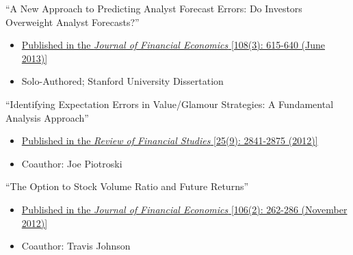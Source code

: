 \pagebreak[0]
\begin{samepage}
\item ``A New Approach to Predicting Analyst Forecast Errors: Do Investors Overweight Analyst Forecasts?''
\begin{itemize}
\vspace*{-.07in}
	\item \href{https://doi.org/10.1016/j.jfineco.2013.02.002}{Published in the {\it Journal of Financial Economics} [108(3): 615-640 (June 2013)]}
\vspace*{-.07in}
	\item  Solo-Authored; Stanford University Dissertation
\end{itemize}
\end{samepage}

\vskip 0.08cm

\pagebreak[0]
\begin{samepage}
\item ``Identifying Expectation Errors in Value/Glamour Strategies: A Fundamental Analysis Approach''
\begin{itemize}
\vspace*{-.07in}
	\item \href{https://doi.org/10.1093/rfs/hhs061}{Published in the {\it Review of Financial Studies} [25(9): 2841-2875 (2012)]}
\vspace*{-.07in}
	\item Coauthor: Joe Piotroski
\end{itemize}
\end{samepage}
\vskip 0.08cm



\pagebreak[0]
\begin{samepage}
\item ``The Option to Stock Volume Ratio and Future Returns''
\begin{itemize}
\vspace*{-.07in}
	\item \href{https://doi.org/10.1016/j.jfineco.2012.05.008}{Published in the {\it Journal of Financial Economics} [106(2): 262-286 (November 2012)]}
	
\vspace*{-.07in}
	\item Coauthor: Travis Johnson
\end{itemize}
\end{samepage}

